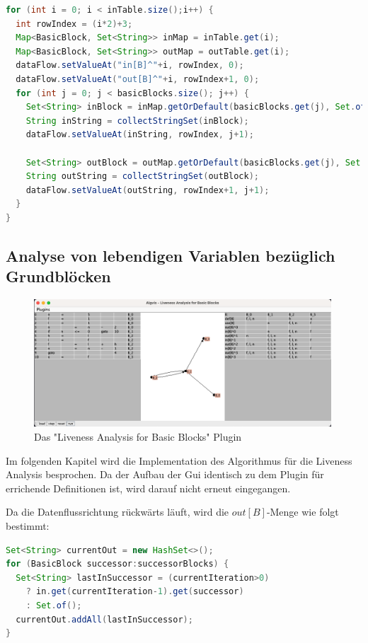 \begin{lstlisting}[language=Java, caption={Visualisierung der $in$ und $out$-Mengen}, label={cde:visinout}]
for (int i = 0; i < inTable.size();i++) {
  int rowIndex = (i*2)+3;
  Map<BasicBlock, Set<String>> inMap = inTable.get(i);
  Map<BasicBlock, Set<String>> outMap = outTable.get(i);
  dataFlow.setValueAt("in[B]^"+i, rowIndex, 0);
  dataFlow.setValueAt("out[B]^"+i, rowIndex+1, 0);
  for (int j = 0; j < basicBlocks.size(); j++) {
    Set<String> inBlock = inMap.getOrDefault(basicBlocks.get(j), Set.of("-"));
    String inString = collectStringSet(inBlock);
    dataFlow.setValueAt(inString, rowIndex, j+1);

    Set<String> outBlock = outMap.getOrDefault(basicBlocks.get(j), Set.of("-"));
    String outString = collectStringSet(outBlock);
    dataFlow.setValueAt(outString, rowIndex+1, j+1);
  }
}
\end{lstlisting}

\newpage
\subsection{Analyse von lebendigen Variablen bezüglich Grundblöcken}
\begin{figure}[h]
  \centering
  \includegraphics[width=0.99\textwidth]{fig/Screenshot_LivenessBb.png}
  \caption{Das "Liveness Analysis for Basic Blocks" Plugin}
  \label{fig:livenessAnalysisBB}
\end{figure}
Im folgenden Kapitel wird die Implementation des Algorithmus für die Liveness
Analysis besprochen. Da der Aufbau der Gui identisch zu dem Plugin für errichende
Definitionen ist, wird darauf nicht erneut eingegangen.

Da die Datenflussrichtung rückwärts läuft, wird die $out[B]$-Menge wie folgt
bestimmt:
\begin{lstlisting}[language=Java, caption={Berechnung der $out$-Menge}, label={cde:laIn}]
Set<String> currentOut = new HashSet<>();
for (BasicBlock successor:successorBlocks) {
  Set<String> lastInSuccessor = (currentIteration>0)
    ? in.get(currentIteration-1).get(successor)
    : Set.of();
  currentOut.addAll(lastInSuccessor);
}
\end{lstlisting}

